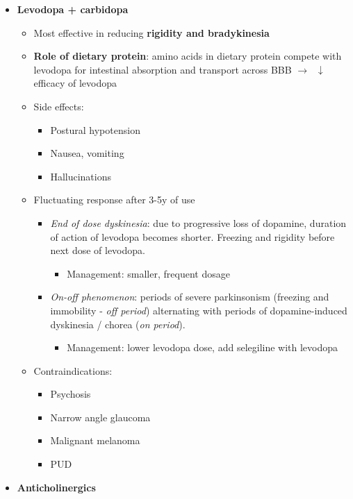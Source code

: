 \documentclass[
  12pt,
]{memoir}
\providecommand{\tightlist}{%
  \setlength{\itemsep}{0pt}\setlength{\parskip}{0pt}}
\begin{document}
\begin{itemize}
\tightlist
\item
  \textbf{Levodopa + carbidopa}

  \begin{itemize}
  \tightlist
  \item
    Most effective in reducing \textbf{rigidity and bradykinesia}
  \item
    \textbf{Role of dietary protein}: amino acids in dietary protein
    compete with levodopa for intestinal absorption and transport across
    BBB \(\rightarrow\;\;\downarrow\) efficacy of levodopa
  \item
    Side effects:

    \begin{itemize}
    \tightlist
    \item
      Postural hypotension
    \item
      Nausea, vomiting
    \item
      Hallucinations
    \end{itemize}
  \item
    Fluctuating response after 3-5y of use

    \begin{itemize}
    \tightlist
    \item
      \emph{End of dose dyskinesia}: due to progressive loss of
      dopamine, duration of action of levodopa becomes shorter. Freezing
      and rigidity before next dose of levodopa.

      \begin{itemize}
      \tightlist
      \item
        Management: smaller, frequent dosage
      \end{itemize}
    \item
      \emph{On-off phenomenon}: periods of severe parkinsonism (freezing
      and immobility - \emph{off period}) alternating with periods of
      dopamine-induced dyskinesia / chorea (\emph{on period}).

      \begin{itemize}
      \tightlist
      \item
        Management: lower levodopa dose, add selegiline with levodopa
      \end{itemize}
    \end{itemize}
  \item
    Contraindications:

    \begin{itemize}
    \tightlist
    \item
      Psychosis
    \item
      Narrow angle glaucoma
    \item
      Malignant melanoma
    \item
      PUD
    \end{itemize}
  \end{itemize}
\item
  \textbf{Anticholinergics}


\end{itemize}
\end{document}
